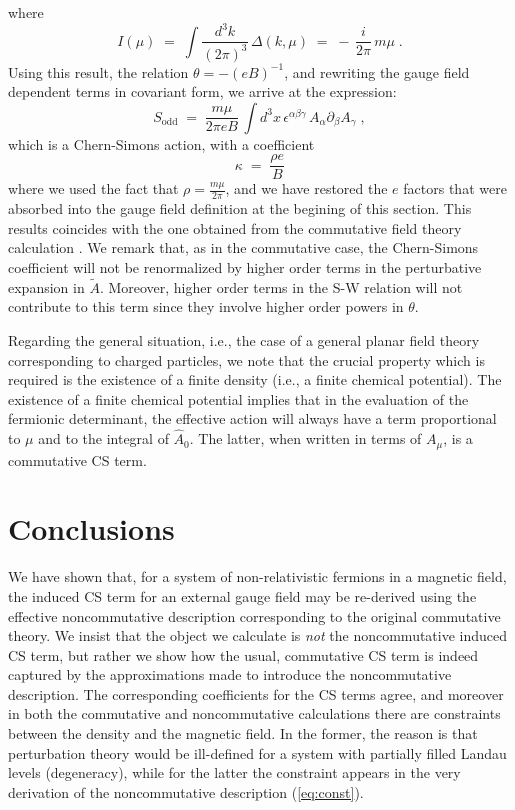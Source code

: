 \documentclass[a4paper,12pt]{article}
\begin{document}
where
\begin{equation}
I(\mu)\;=\;\int \frac{d^3k}{(2\pi)^3}\, \Delta (k,\mu) \;=\; -\, \frac{i}{2\pi} \,  m \mu  \;.
\end{equation}
Using this result, the relation $\theta = - (e B)^{-1}$, and rewriting the
gauge field dependent terms in covariant form, we arrive at the
expression:
\begin{equation}
  \label{eq:seffcs}
 S_{\mathrm{odd}} \;=\; \frac{m \mu}{2 \pi e B}  \, 
\int d^3x \, \epsilon^{\alpha\beta\gamma} \, A_\alpha \partial_\beta A_\gamma \;, 
\end{equation} 
which is a Chern-Simons action, with a coefficient 
\begin{equation}
\kappa \;=\; \frac{\rho e}{ B}
\end{equation}
where we used the fact that $\rho = \frac{m \mu}{2 \pi}$, and we have 
restored the $e$ factors that were absorbed into the gauge field 
definition at the begining of this section. This results
coincides with the one obtained from the commutative field theory
calculation \cite{lf}. We remark that, as in the commutative case, 
the Chern-Simons coefficient will not be renormalized by higher 
order terms in the perturbative expansion in $\tilde A$. Moreover, 
higher order terms in the S-W relation will not contribute to this 
term since they involve higher order powers in $\theta$.

Regarding the general situation, i.e., the case of a general planar
field theory corresponding to charged particles, we note that the
crucial property which is required is the existence of a finite
density (i.e., a finite chemical potential).  The existence of a
finite chemical potential implies that in the evaluation of the
fermionic determinant, the effective action will always have a term
proportional to $\mu$ and to the integral of ${\widehat A}_0$. The
latter, when written in terms of $A_\mu$, is a commutative CS term.

\section {Conclusions}\label{sec:conc}
We have shown that, for a system of non-relativistic fermions in a
magnetic field, the induced CS term for an external gauge field may be
re-derived using the effective noncommutative description corresponding
to the original commutative theory. We insist that the object we
calculate is {\em not\/} the noncommutative induced CS term, but
rather we show how the usual, commutative CS term is indeed captured
by the approximations made to introduce the noncommutative
description.  The corresponding coefficients for the CS terms agree,
and moreover in both the commutative and noncommutative calculations
there are constraints between the density and the magnetic field. In
the former, the reason is that perturbation theory would be
ill-defined for a system with partially filled Landau  levels (degeneracy),
while for the latter the constraint appears in the very derivation of
the noncommutative description (\ref{eq:const}). 
\end{document}
